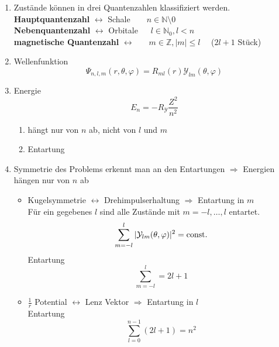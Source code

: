 \begin{enumerate}[1)]
	\item Zustände können in drei Quantenzahlen klassifiziert werden.\\[5pt]
	\textbf{Hauptquantenzahl} $ \leftrightarrow $ Schale $\quad \ \ \ n \in \mathbb{N} \setminus 0 $\\[5pt]
	\textbf{Nebenquantenzahl} $ \leftrightarrow $ Orbitale $ \quad \: l \in \mathbb{N}_0 , l < n $\\[5pt]
	\textbf{magnetische Quantenzahl} $ \leftrightarrow $ $ \quad \ \ m \in \mathbb{Z} , |m| \le l \quad $ ($ 2l + 1 $ Stück)
	\item Wellenfunktion
	\begin{equation*}
	\Psi_{n,l,m}(r,\theta,\varphi) = R_{ml}(r) \mathcal{Y}_{lm}(\theta,\varphi)
	\end{equation*}
	\item Energie
	\begin{equation*}
	E_n = - R_{\mathcal{Y}}\frac{Z^2}{n^2}
	\end{equation*}
	\begin{enumerate}[$ \Rightarrow $]
		\item hängt nur von $ n $ ab, nicht von $ l $ und $ m $
		\item Entartung
	\end{enumerate}
	\item Symmetrie des Problems erkennt man an den Entartungen
	$ \Rightarrow $ Energien hängen nur von $ n $ ab
	\begin{itemize}
		\item Kugelsymmetrie $ \leftrightarrow $ Drehimpulserhaltung $ \Rightarrow $ Entartung in $ m $\\[5pt]
		Für ein gegebenes $ l $ sind alle Zustände mit  $ m = -l, \dots, l $ entartet.
		\begin{equation*}
		\sum_{m=-l}^{l} |\mathcal{Y}_{lm}(\theta,\varphi)|^2 = \textrm{const.}
		\end{equation*}
		Entartung
		\begin{equation*}
		\sum_{m=-l}^{l} = 2l + 1
		\end{equation*}
		\item $ \frac{1}{r} $ Potential $ \leftrightarrow $ Lenz Vektor $ \Rightarrow $ Entartung in $ l $\\[5pt]
		Entartung
		$$ \sum_{l=0}^{n-1} (2l+1) = n^2 $$
	\end{itemize}
	\\
\end{enumerate}

